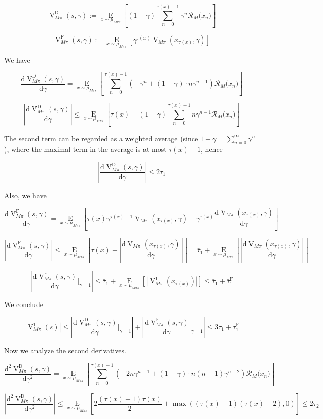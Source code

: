 \documentclass[a4paper]{article}
\newcommand{\AP}[1]{\left(#1\right)}
\newcommand{\AB}[1]{\left[#1\right]}
\newcommand{\Ea}[2]{\underset{#1}{\operatorname{E}}\AB{#2}}
\newcommand{\D}{\mathrm{d}}
\newcommand{\Abs}[1]{\left\vert #1 \right\vert}
\newcommand{\R}{\mathcal{R}}
\newcommand{\RMD}{\mathrm{D}}
\newcommand{\RMF}{\mathrm{F}}
\newcommand{\V}{\operatorname{V}}
\begin{document}
$$\V_{M\pi}^\RMD(s,\gamma) := \Ea{x\sim\mu_{M\pi s}}{(1-\gamma)\sum_{n=0}^{\tau(x)-1} \gamma^n \R_M\Big(x_n\Big) }$$

$$\V_{M\pi}^\RMF(s,\gamma) := \Ea{x\sim\mu_{M\pi s}}{\gamma^{\tau(x)}\V_{M\pi}\AP{x_{\tau(x)},\gamma}}$$

We have

$$\frac{\D\V_{M\pi}^\RMD(s,\gamma)}{\D\gamma} = \Ea{x\sim\mu_{M\pi s}}{\sum_{n=0}^{\tau(x)-1} \AP{-\gamma^n+(1-\gamma)\cdot n\gamma^{n-1}} \R_M\Big(x_n\Big)}$$

$$\Abs{\frac{\D\V_{M\pi}^\RMD(s,\gamma)}{\D\gamma}} \leq \Ea{x\sim\mu_{M\pi s}}{\tau(x)+(1-\gamma)\sum_{n=0}^{\tau(x)-1} n\gamma^{n-1} \R_M\Big(x_n\Big) }$$

The second term can be regarded as a weighted average (since $1-\gamma=\sum_{n=0}^\infty \gamma^n$), where the maximal term in the average is at most $\tau(x)-1$, hence

$$\Abs{\frac{\D\V_{M\pi}^\RMD(s,\gamma)}{\D\gamma}} \leq 2 \bar{\tau}_1$$

Also, we have

$$\frac{\D\V_{M\pi}^\RMF(s,\gamma)}{\D\gamma} = \Ea{x\sim\mu_{M\pi s}}{\tau(x)\gamma^{\tau(x)-1}\V_{M\pi}\AP{x_{\tau(x)},\gamma}+\gamma^{\tau(x)}\frac{\D\V_{M\pi}\AP{x_{\tau(x)},\gamma}}{\D\gamma}}$$

$$\Abs{\frac{\D\V_{M\pi}^\RMF(s,\gamma)}{\D\gamma}} \leq \Ea{x\sim\mu_{M\pi s}}{ \tau(x)+\Abs{\frac{\D\V_{M\pi}\AP{x_{\tau(x)},\gamma}}{\D\gamma}}} = \bar{\tau}_1 + \Ea{x\sim\mu_{M\pi s}}{\Abs{\frac{\D\V_{M\pi}\AP{x_{\tau(x)},\gamma}}{\D\gamma}}}$$

$$\Abs{\frac{\D\V_{M\pi}^\RMF(s,\gamma)}{\D\gamma}\bigg\vert_{\gamma=1}} \leq \bar{\tau}_1 + \Ea{x\sim\mu_{M\pi s}}{\Abs{\V_{M\pi}^1\AP{x_{\tau(x)}}}} \leq \bar{\tau}_1 + \bar{\tau}_1^\RMF$$

We conclude

$$\Abs{\V_{M\pi}^1(s)} \leq \Abs{\frac{\D\V_{M\pi}^\RMD(s,\gamma)}{\D\gamma}\bigg\vert_{\gamma=1}}+\Abs{\frac{\D\V_{M\pi}^\RMF(s,\gamma)}{\D\gamma}\bigg\vert_{\gamma=1}} \leq 3 \bar{\tau}_1 + \bar{\tau}_1^\RMF$$

Now we analyze the second derivatives.

$$\frac{\D^2\V_{M\pi}^\RMD(s,\gamma)}{\D\gamma^2} = \Ea{x\sim\mu_{M\pi s}}{\sum_{n=0}^{\tau(x)-1} \AP{-2n\gamma^{n-1}+(1-\gamma)\cdot n(n-1)\gamma^{n-2}} \R_M\Big(x_n\Big)}$$

$$\Abs{\frac{\D^2\V_{M\pi}^\RMD(s,\gamma)}{\D\gamma^2}} \leq \Ea{x\sim\mu_{M\pi s}}{2\frac{\AP{\tau(x)-1}\tau(x)}{2} + \max\AP{\AP{\tau(x)-1}\AP{\tau(x)-2},0}} \leq 2\bar{\tau}_2$$
\end{document}
